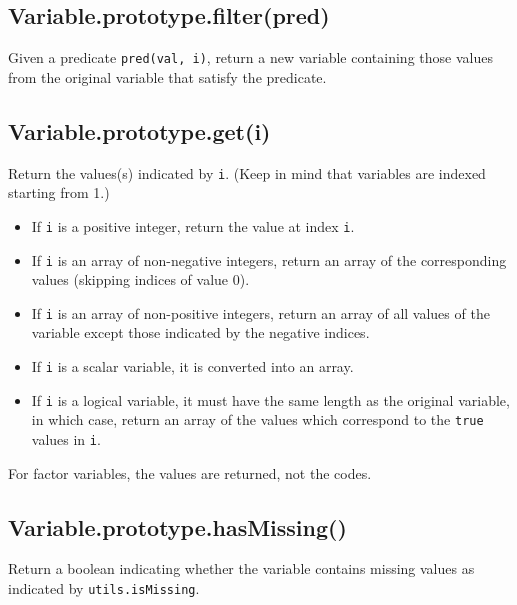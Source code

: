 \documentclass{article}
\begin{document}
    \subsection*{Variable.prototype.filter(pred)}
    Given a predicate \texttt{pred(val, i)}, return a new variable containing
those values from the original variable that satisfy the predicate.


    \subsection*{Variable.prototype.get(i)}
    Return the values(s) indicated by \texttt{i}.  (Keep in mind that variables
are indexed starting from 1.)


\begin{itemize}

\item If \texttt{i} is a positive integer, return the value at index \texttt{i}.

\item If \texttt{i} is an array of non-negative integers, return an array of
the corresponding values (skipping indices of value 0).

\item If \texttt{i} is an array of non-positive integers, return an array of
all values of the variable except those indicated by the negative indices.

\item If \texttt{i} is a scalar variable, it is converted into an array.

\item If \texttt{i} is a logical variable, it must have the same length as the original
variable, in which case, return an array of the values which correspond to the
\texttt{true} values in \texttt{i}.

\end{itemize}

For factor variables, the values are returned, not the codes.


    \subsection*{Variable.prototype.hasMissing()}
    Return a boolean indicating whether the variable contains missing values
as indicated by \texttt{utils.isMissing}.
\end{document}
